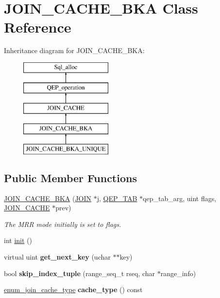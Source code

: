 \hypertarget{classJOIN__CACHE__BKA}{}\section{J\+O\+I\+N\+\_\+\+C\+A\+C\+H\+E\+\_\+\+B\+KA Class Reference}
\label{classJOIN__CACHE__BKA}
Inheritance diagram for J\+O\+I\+N\+\_\+\+C\+A\+C\+H\+E\+\_\+\+B\+KA\+:\begin{figure}[H]
\begin{center}
\leavevmode
\includegraphics[height=5.000000cm]{classJOIN__CACHE__BKA}
\end{center}
\end{figure}
\subsection*{Public Member Functions}
\begin{DoxyCompactItemize}
\item 
\mbox{\label{classJOIN__CACHE__BKA_a46f27f159e7ded7ee2306080850573be}} 
\mbox{\hyperlink{classJOIN__CACHE__BKA_a46f27f159e7ded7ee2306080850573be}{J\+O\+I\+N\+\_\+\+C\+A\+C\+H\+E\+\_\+\+B\+KA}} (\mbox{\hyperlink{classJOIN}{J\+O\+IN}} $\ast$j, \mbox{\hyperlink{classQEP__TAB}{Q\+E\+P\+\_\+\+T\+AB}} $\ast$qep\+\_\+tab\+\_\+arg, uint flags, \mbox{\hyperlink{classJOIN__CACHE}{J\+O\+I\+N\+\_\+\+C\+A\+C\+HE}} $\ast$prev)
\begin{DoxyCompactList}\small\item\em The M\+RR mode initially is set to \textquotesingle{}flags\textquotesingle{}. \end{DoxyCompactList}\item 
int \mbox{\hyperlink{group__Query__Optimizer_ga327376f63198bf31a770fb89242d49aa}{init}} ()
\item 
virtual uint {\bfseries get\+\_\+next\+\_\+key} (uchar $\ast$$\ast$key)
\item 
bool {\bfseries skip\+\_\+index\+\_\+tuple} (range\+\_\+seq\+\_\+t rseq, char $\ast$range\+\_\+info)
\item 
\mbox{\label{classJOIN__CACHE__BKA_a513c2d6e7e06ff1ac3ef8a3e07b51ea7}} 
\mbox{\hyperlink{classJOIN__CACHE_a74b45254b4573b9531f1b8b536b18e46}{enum\+\_\+join\+\_\+cache\+\_\+type}} {\bfseries cache\+\_\+type} () const
\end{DoxyCompactItemize}
